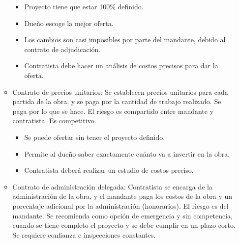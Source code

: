 \documentclass{article} %
\begin{document}
\begin{itemize}[label={},left=0pt,align=parleft]
\begin{itemize}[label={},left=1em,align=parleft]
        \begin{itemize}[label={},left=2em,align=parleft]
            \item \begin{highlightbox}[levelthree] Proyecto tiene que estar 100\% definido. \end{highlightbox}
            \item \begin{highlightbox}[levelthree] Dueño escoge la mejor oferta. \end{highlightbox}
            \item \begin{highlightbox}[levelthree] Los cambios son casi imposibles por parte del mandante, debido al contrato de adjudicación. \end{highlightbox}
            \item \begin{highlightbox}[levelthree] Contratista debe hacer un análisis de costos precisos para dar la oferta. \end{highlightbox}
        \end{itemize}
        \item \begin{highlightbox}[leveltwo] Contrato de precios unitarios: Se establecen precios unitarios para cada partida de la obra, y se paga por la cantidad de trabajo realizado. Se paga por lo que se hace. El riesgo es compartido entre mandante y contratista. Es competitivo. \end{highlightbox}
        \begin{itemize}[label={},left=2em,align=parleft]
            \item \begin{highlightbox}[levelthree] Se puede ofertar sin tener el proyecto definido. \end{highlightbox}
            \item \begin{highlightbox}[levelthree] Permite al dueño saber exactamente cuánto va a invertir en la obra. \end{highlightbox}
            \item \begin{highlightbox}[levelthree] Contratista deberá realizar un estudio de costos preciso. \end{highlightbox}
        \end{itemize}
        \item \begin{highlightbox}[leveltwo] Contrato de administración delegada: Contratista se encarga de la administración de la obra, y el mandante paga los costos de la obra y un porcentaje adicional por la administración (honorarios). El riesgo es del mandante. Se recomienda como opción de emergencia y sin competencia, cuando se tiene completo el proyecto y se debe cumplir en un plazo corto. Se requiere confianza e inspecciones constantes. \end{highlightbox}

\end{itemize}
\end{itemize}
\end{document}
